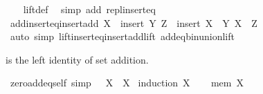 \begin{isabellebody}
%
\isadelimproof
\ \ %
\endisadelimproof
%
\isatagproof
{}\isamarkupfalse%
\ lift{\isacharunderscore}{\kern0pt}def\ \isamarkupfalse%
\ {\isacharparenleft}{\kern0pt}simp\ add{\isacharcolon}{\kern0pt}\ repl{\isacharunderscore}{\kern0pt}insert{\isacharunderscore}{\kern0pt}eq{\isacharparenright}{\kern0pt}%
\endisatagproof
{\isafoldproof}%
%
\isadelimproof
\isanewline
%
\endisadelimproof
\isanewline
{}\isamarkupfalse%
\ add{\isacharunderscore}{\kern0pt}insert{\isacharunderscore}{\kern0pt}eq{\isacharunderscore}{\kern0pt}insert{\isacharunderscore}{\kern0pt}add{\isacharcolon}{\kern0pt}\ {\isachardoublequoteopen}X\ {\isacharplus}{\kern0pt}\ insert\ Y\ Z\ {\isacharequal}{\kern0pt}\ insert\ {\isacharparenleft}{\kern0pt}X\ {\isacharplus}{\kern0pt}\ Y{\isacharparenright}{\kern0pt}\ {\isacharparenleft}{\kern0pt}X\ {\isacharplus}{\kern0pt}\ Z{\isacharparenright}{\kern0pt}{\isachardoublequoteclose}\isanewline
%
\isadelimproof
\ \ %
\endisadelimproof
%
\isatagproof
{}\isamarkupfalse%
\ {\isacharparenleft}{\kern0pt}auto\ simp{\isacharcolon}{\kern0pt}\ lift{\isacharunderscore}{\kern0pt}insert{\isacharunderscore}{\kern0pt}eq{\isacharunderscore}{\kern0pt}insert{\isacharunderscore}{\kern0pt}add{\isacharunderscore}{\kern0pt}lift\ add{\isacharunderscore}{\kern0pt}eq{\isacharunderscore}{\kern0pt}bin{\isacharunderscore}{\kern0pt}union{\isacharunderscore}{\kern0pt}lift{\isacharparenright}{\kern0pt}%
\endisatagproof
{\isafoldproof}%
%
\isadelimproof
%
\endisadelimproof
%
\isadelimdocument
%
\endisadelimdocument
%
\isatagdocument
%
\isamarkuptrue%
%
\endisatagdocument
{\isafolddocument}%
%
\isadelimdocument
%
\endisadelimdocument
%
\begin{isamarkuptext}%
 is the left identity of set addition.%
\end{isamarkuptext}\isamarkuptrue%
\isamarkupfalse%
\ zero{\isacharunderscore}{\kern0pt}add{\isacharunderscore}{\kern0pt}eq{\isacharunderscore}{\kern0pt}self\ {\isacharbrackleft}{\kern0pt}simp{\isacharbrackright}{\kern0pt}{\isacharcolon}{\kern0pt}\ {\isachardoublequoteopen}{}\ {\isacharplus}{\kern0pt}\ X\ {\isacharequal}{\kern0pt}\ X{\isachardoublequoteclose}\isanewline
%
\isadelimproof
%
\endisadelimproof
%
\isatagproof
{}\isamarkupfalse%
\ {\isacharparenleft}{\kern0pt}induction\ X{\isacharparenright}{\kern0pt}\isanewline
\ \ \isamarkupfalse%
\ {\isacharparenleft}{\kern0pt}mem\ X{\isacharparenright}{\kern0pt}\isanewline

\end{isabellebody}
